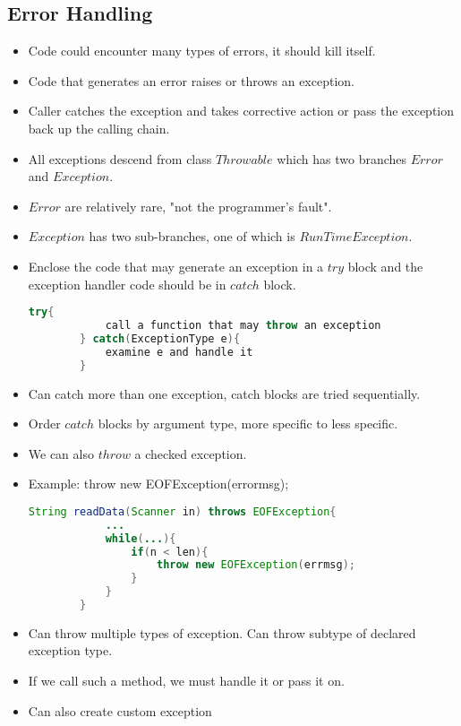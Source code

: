 \documentclass[a4paper]{article}
\begin{document}
\subsection{Error Handling}
\begin{itemize}
    \item Code could encounter many types of errors, it should kill itself.
    \item Code that generates an error raises or throws an exception.
    \item Caller catches the exception and takes corrective action or pass the exception back up the calling chain.
    \item All exceptions descend from class $Throwable$ which has two branches $Error$ and $Exception$.
    \item $Error$ are relatively rare, "not the programmer's fault".
    \item $Exception$ has two sub-branches, one of which is $RunTimeException$.
    \item Enclose the code that may generate an exception in a $try$ block and the exception handler code should be in $catch$ block.
    \begin{lstlisting}[language=Java]
        try{
            call a function that may throw an exception
        } catch(ExceptionType e){
            examine e and handle it
        }
    \end{lstlisting}
    \item Can catch more than one exception, catch blocks are tried sequentially.
    \item Order $catch$ blocks by argument type, more specific to less specific.
    \item We can also $throw$ a checked exception.
    \item Example: throw new EOFException(errormsg);
    \begin{lstlisting}[language=Java]
        String readData(Scanner in) throws EOFException{
            ...
            while(...){
                if(n < len){
                    throw new EOFException(errmsg);
                }
            }
        }
    \end{lstlisting}
    \item Can throw multiple types of exception. Can throw subtype of declared exception type.
    \item If we call such a method, we must handle it or pass it on.
    \item Can also create custom exception
    \begin{lstlisting}[language=Java]

\end{lstlisting}
\end{itemize}
\end{document}
